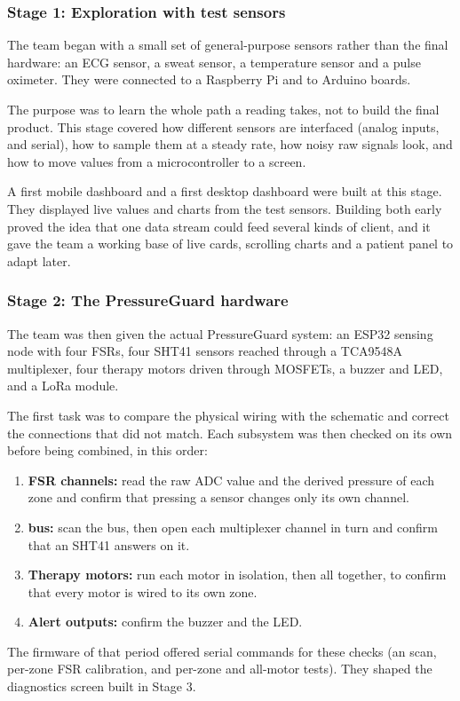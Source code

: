 \subsubsection{Stage 1: Exploration with test sensors}
The team began with a small set of general-purpose sensors rather than the final hardware: an ECG sensor, a sweat sensor, a temperature sensor and a pulse oximeter. They were connected to a Raspberry Pi and to Arduino boards.

The purpose was to learn the whole path a reading takes, not to build the final product. This stage covered how different sensors are interfaced (analog inputs, \itwoc{} and serial), how to sample them at a steady rate, how noisy raw signals look, and how to move values from a microcontroller to a screen.

A first mobile dashboard and a first desktop dashboard were built at this stage. They displayed live values and charts from the test sensors. Building both early proved the idea that one data stream could feed several kinds of client, and it gave the team a working base of live cards, scrolling charts and a patient panel to adapt later.

\subsubsection{Stage 2: The PressureGuard hardware}
The team was then given the actual PressureGuard system: an ESP32 sensing node with four FSRs, four SHT41 sensors reached through a TCA9548A \itwoc{} multiplexer, four therapy motors driven through MOSFETs, a buzzer and LED, and a LoRa module.

The first task was to compare the physical wiring with the schematic and correct the connections that did not match. Each subsystem was then checked on its own before being combined, in this order:
\begin{enumerate}
\item \textbf{FSR channels:} read the raw ADC value and the derived pressure of each zone and confirm that pressing a sensor changes only its own channel.
\item \textbf{\itwoc{} bus:} scan the bus, then open each multiplexer channel in turn and confirm that an SHT41 answers on it.
\item \textbf{Therapy motors:} run each motor in isolation, then all together, to confirm that every motor is wired to its own zone.
\item \textbf{Alert outputs:} confirm the buzzer and the LED.
\end{enumerate}
The firmware of that period offered serial commands for these checks (an \itwoc{} scan, per-zone FSR calibration, and per-zone and all-motor tests). They shaped the diagnostics screen built in Stage 3.

